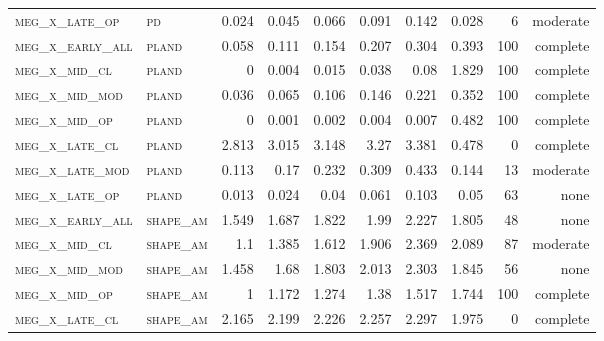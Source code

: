 \begin{landscape}
\begin{center}
\begin{footnotesize}
\begin{longtable}{llrrrrr|rrr}
\textsc{meg\_x\_late\_op  } & \textsc{pd        }    & 0.024    & 0.045    & 0.066    & 0.091    & 0.142     & 0.028         & 6             & moderate             \\
\textsc{meg\_x\_early\_all} & \textsc{pland     }    & 0.058    & 0.111    & 0.154    & 0.207    & 0.304     & 0.393         & 100           & complete             \\
\textsc{meg\_x\_mid\_cl   } & \textsc{pland     }    & 0        & 0.004    & 0.015    & 0.038    & 0.08      & 1.829         & 100           & complete             \\
\textsc{meg\_x\_mid\_mod  } & \textsc{pland     }    & 0.036    & 0.065    & 0.106    & 0.146    & 0.221     & 0.352         & 100           & complete             \\
\textsc{meg\_x\_mid\_op   } & \textsc{pland     }    & 0        & 0.001    & 0.002    & 0.004    & 0.007     & 0.482         & 100           & complete             \\
\textsc{meg\_x\_late\_cl  } & \textsc{pland     }    & 2.813    & 3.015    & 3.148    & 3.27     & 3.381     & 0.478         & 0             & complete            \\
\textsc{meg\_x\_late\_mod } & \textsc{pland     }    & 0.113    & 0.17     & 0.232    & 0.309    & 0.433     & 0.144         & 13            & moderate             \\
\textsc{meg\_x\_late\_op  } & \textsc{pland     }    & 0.013    & 0.024    & 0.04     & 0.061    & 0.103     & 0.05          & 63            & none              \\
\textsc{meg\_x\_early\_all} & \textsc{shape\_am }    & 1.549    & 1.687    & 1.822    & 1.99     & 2.227     & 1.805         & 48            & none              \\
\textsc{meg\_x\_mid\_cl   } & \textsc{shape\_am }    & 1.1      & 1.385    & 1.612    & 1.906    & 2.369     & 2.089         & 87            & moderate              \\
\textsc{meg\_x\_mid\_mod  } & \textsc{shape\_am }    & 1.458    & 1.68     & 1.803    & 2.013    & 2.303     & 1.845         & 56            & none              \\
\textsc{meg\_x\_mid\_op   } & \textsc{shape\_am }    & 1        & 1.172    & 1.274    & 1.38     & 1.517     & 1.744         & 100           & complete             \\
\textsc{meg\_x\_late\_cl  } & \textsc{shape\_am }    & 2.165    & 2.199    & 2.226    & 2.257    & 2.297     & 1.975         & 0             & complete            \\

\end{longtable}
\end{footnotesize}
\end{center}
\end{landscape}
